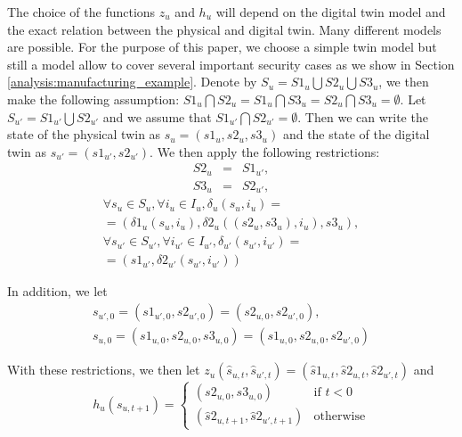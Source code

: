 The choice of the functions $z_u$ and $h_u$ will depend on the digital twin model and the exact relation between the physical and digital twin. Many different models are possible. For the purpose of this paper, we choose a simple twin model but still a model allow to cover several important security cases as we show in Section \ref{analysis:manufacturing_example}. Denote by  $S_u = S1_u \bigcup S2_u \bigcup S3_u$, we then make the following assumption:  $S1_u \bigcap S2_u = S1_u \bigcap S3_u = S2_u \bigcap S3_u = \emptyset$. Let $S_{u'} = S1_{u'} \bigcup S2_{u'}$ and we assume that $S1_{u'} \bigcap S2_{u'} = \emptyset$. Then we can write the state of the physical twin as $s_u = (s1_u,s2_u,s3_u)$ and the state of the digital twin as $s_{u'} = (s1_{u'},s2_{u'})$. We then apply the following restrictions:
\begin{eqnarray}
 S2_u   & = &  S1_{u'}, \label{arch:s2eq}\\
 S3_u   & = & S2_{u'} \label{arch:s3eq}, 
 \end{eqnarray}
 \begin{eqnarray} 
 \forall s_u \in S_u,  \forall i_u \in I_u, \delta_u(s_u,i_u)   =  \nonumber \\  
 = (\delta1_u(s_u,i_u), \delta2_u((s2_u,s3_u),i_u), s3_u), \label{arch:phystransrestric}\\
  \forall s_{u'} \in S_{u'}, \forall i_{u'} \in I_{u'},  \delta_{u'}(s_{u'},i_{u'})   =  \nonumber \\  
 =   (s1_{u'}, \delta2_{u'}(s_{u'},i_{u'})) \label{arch:digtransrestric}
\end{eqnarray}

In addition, we let
\begin{eqnarray}
 s_{u',0}  =  (s1_{u',0},s2_{u',0}) = (s2_{u,0},s2_{u',0}), \label{arch:digsynchstart}\\
 s_{u,0}  =  (s1_{u,0},s2_{u,0},s3_{u,0}) = (s1_{u,0},s2_{u,0},s2_{u',0}) \label{arch:physsynchstart}
\end{eqnarray}

With these restrictions, we then let $z_u(\hat{s}_{u,t},\hat{s}_{u',t}) = (\hat{s}1_{u,t}, \hat{s}2_{u,t}, \hat{s}2_{u',t})$ and
\begin{equation}
h_u(s_{u,t+1})
= \left \{ \begin{array}{ll}
(s2_{u,0},s3_{u,0})   & \mbox{if $t<0$} \\
(\hat{s}2_{u,t+1}, \hat{s}2_{u',t+1}) & \mbox{otherwise}  \end{array} \right.
 \label{arch:zerostate}
\end{equation}

